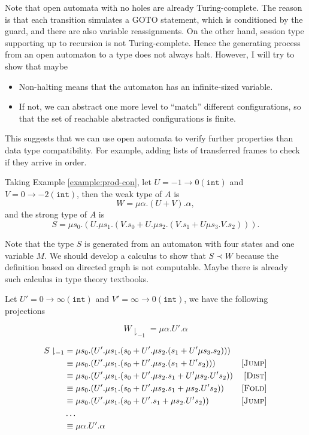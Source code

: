 Note that open automata with no holes are already Turing-complete. The reason is that each transition simulates a GOTO statement, which is conditioned by the guard, and there are also variable reassignments. On the other hand, session type supporting up to recursion is not Turing-complete. Hence the generating process from an open automaton to a type does not always halt. However, I will try to show that maybe
\begin{itemize}
  \item Non-halting means that the automaton has an infinite-sized variable.
  \item If not, we can abstract one more level to ``match'' different configurations, so that the set of reachable abstracted configurations is finite.
\end{itemize}


This suggests that we can use open automata to verify further properties than data type compatibility. For example, adding lists of transferred frames to check if they arrive in order.


Taking Example \ref{example:prod-con}, let $U = -1\to 0 (\texttt{int})$ and $V = 0\to -2 (\texttt{int})$, then the weak type of $A$ is $$W = \mu\alpha. (U+V).\alpha,$$
and the strong type of $A$ is
$$S=\mu s_0.(U.\mu s_1.(V.s_0 + U.\mu s_2.(V.s_1 + U\mu s_3.V.s_2))).$$

Note that the type $S$ is generated from an automaton with four states and one variable $M$. We should develop a calculus to show that $S\prec W$ because the definition based on directed graph is not computable. Maybe there is already such calculus in type theory textbooks.

Let $U'=0\to\infty(\texttt{int})$ and $V'=\infty\to 0 (\texttt{int})$, we have the following projections

$$W\downharpoonright_{-1}= \mu\alpha.U'.\alpha$$

\begin{align*}
  S\downharpoonright_{-1} & =\mu s_0.(U'.\mu s_1.(s_0 + U'.\mu s_2.(s_1 + U'\mu s_3.s_2)))                                           \\
                          & \equiv \mu s_0.(U'.\mu s_1.(s_0 + U'.\mu s_2.(s_1 + U's_2)))                           & [\textsc{Jump}] \\
                          & \equiv \mu s_0.(U'.\mu s_1.(s_0 + U'.\mu s_2.s_1 + U'\mu s_2.U's_2))                   & [\textsc{Dist}] \\
                          & \equiv \mu s_0.(U'.\mu s_1.(s_0 + U'.\mu s_2.s_1 + \mu s_2.U's_2))                     & [\textsc{Fold}] \\
                          & \equiv \mu s_0.(U'.\mu s_1.(s_0 + U'.s_1 + \mu s_2.U's_2))                             & [\textsc{Jump}] \\
                          & \ldots                                                                                                   \\
                          & \equiv                                                             \mu\alpha.U'.\alpha
\end{align*}

